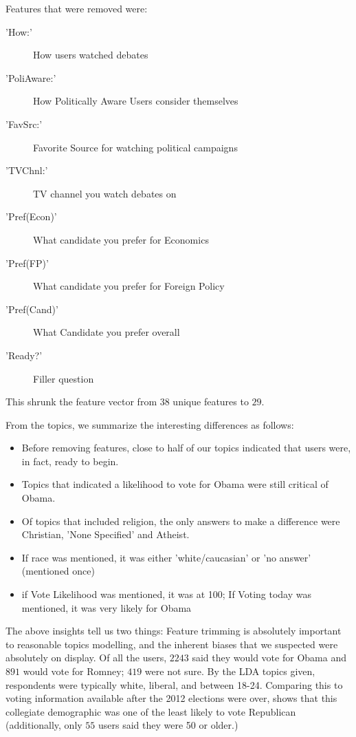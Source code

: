 Features that were removed were:
\begin{description}
\item['How:'] How users watched debates
\item['PoliAware:'] How Politically Aware Users consider themselves
\item['FavSrc:'] Favorite Source for watching political campaigns
\item['TVChnl:'] TV channel you watch debates on
\item['Pref(Econ)'] What candidate you prefer for Economics
\item['Pref(FP)'] What candidate you prefer for Foreign Policy
\item['Pref(Cand)'] What Candidate you prefer overall
\item['Ready?'] Filler question
\end{description}
 This shrunk the feature vector from $38$ unique features to $29$.


From the topics, we summarize the interesting differences as follows:
\begin{itemize}
\item Before removing features, close to half of our topics indicated that users were, in fact, ready to begin.
\item Topics that indicated a likelihood to vote for Obama were still critical of Obama. 
\item Of topics that included religion, the only answers to  make a difference were Christian, 'None Specified' and Atheist.
\item If race was mentioned, it was either 'white/caucasian' or 'no answer' (mentioned once)
\item if Vote Likelihood was mentioned, it was at 100; If Voting today was mentioned, it was very likely for Obama
\end{itemize}

The above insights tell us two things: Feature trimming is absolutely important to reasonable topics modelling, and the inherent biases that we suspected were absolutely on display. Of all the users, $2243$ said they would vote for Obama and $891$ would vote for Romney; $419$ were not sure. By the LDA topics given, respondents were typically white, liberal, and between 18-24.  Comparing this to voting information available after the 2012 elections were over, shows that this collegiate demographic was one of the least likely to vote Republican (additionally, only $55$ users said they were 50 or older.)

